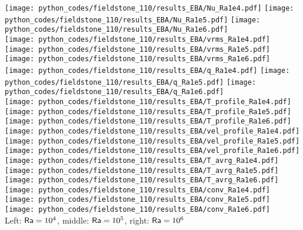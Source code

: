 \begin{center}
\texttt{[image: python\_codes/fieldstone\_110/results\_EBA/Nu\_Ra1e4.pdf]}
\texttt{[image: python\_codes/fieldstone\_110/results\_EBA/Nu\_Ra1e5.pdf]}
\texttt{[image: python\_codes/fieldstone\_110/results\_EBA/Nu\_Ra1e6.pdf]}\\
\texttt{[image: python\_codes/fieldstone\_110/results\_EBA/vrms\_Ra1e4.pdf]}
\texttt{[image: python\_codes/fieldstone\_110/results\_EBA/vrms\_Ra1e5.pdf]}
\texttt{[image: python\_codes/fieldstone\_110/results\_EBA/vrms\_Ra1e6.pdf]}\\
\texttt{[image: python\_codes/fieldstone\_110/results\_EBA/q\_Ra1e4.pdf]}
\texttt{[image: python\_codes/fieldstone\_110/results\_EBA/q\_Ra1e5.pdf]}
\texttt{[image: python\_codes/fieldstone\_110/results\_EBA/q\_Ra1e6.pdf]}\\
\texttt{[image: python\_codes/fieldstone\_110/results\_EBA/T\_profile\_Ra1e4.pdf]}
\texttt{[image: python\_codes/fieldstone\_110/results\_EBA/T\_profile\_Ra1e5.pdf]}
\texttt{[image: python\_codes/fieldstone\_110/results\_EBA/T\_profile\_Ra1e6.pdf]}\\
\texttt{[image: python\_codes/fieldstone\_110/results\_EBA/vel\_profile\_Ra1e4.pdf]}
\texttt{[image: python\_codes/fieldstone\_110/results\_EBA/vel\_profile\_Ra1e5.pdf]}
\texttt{[image: python\_codes/fieldstone\_110/results\_EBA/vel\_profile\_Ra1e6.pdf]}\\
\texttt{[image: python\_codes/fieldstone\_110/results\_EBA/T\_avrg\_Ra1e4.pdf]}
\texttt{[image: python\_codes/fieldstone\_110/results\_EBA/T\_avrg\_Ra1e5.pdf]}
\texttt{[image: python\_codes/fieldstone\_110/results\_EBA/T\_avrg\_Ra1e6.pdf]}\\
\texttt{[image: python\_codes/fieldstone\_110/results\_EBA/conv\_Ra1e4.pdf]}
\texttt{[image: python\_codes/fieldstone\_110/results\_EBA/conv\_Ra1e5.pdf]}
\texttt{[image: python\_codes/fieldstone\_110/results\_EBA/conv\_Ra1e6.pdf]}\\
{\captionfont Left: ${\mathsf{Ra}}=10^4$, middle: ${\mathsf{Ra}}=10^5$, right: ${\mathsf{Ra}}=10^6$} 
\end{center}

